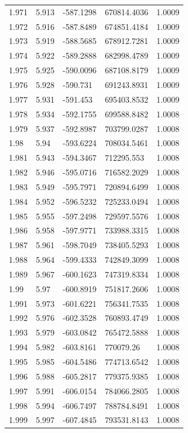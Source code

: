 \begin{tabular}{lllll}
1.971 & 5.913 & -587.1298 & 670814.4036 & 1.0009 \\
1.972 & 5.916 & -587.8489 & 674851.4184 & 1.0009 \\
1.973 & 5.919 & -588.5685 & 678912.7281 & 1.0009 \\
1.974 & 5.922 & -589.2888 & 682998.4789 & 1.0009 \\
1.975 & 5.925 & -590.0096 & 687108.8179 & 1.0009 \\
1.976 & 5.928 & -590.731 & 691243.8931 & 1.0009 \\
1.977 & 5.931 & -591.453 & 695403.8532 & 1.0009 \\
1.978 & 5.934 & -592.1755 & 699588.8482 & 1.0008 \\
1.979 & 5.937 & -592.8987 & 703799.0287 & 1.0008 \\
1.98 & 5.94 & -593.6224 & 708034.5461 & 1.0008 \\
1.981 & 5.943 & -594.3467 & 712295.553 & 1.0008 \\
1.982 & 5.946 & -595.0716 & 716582.2029 & 1.0008 \\
1.983 & 5.949 & -595.7971 & 720894.6499 & 1.0008 \\
1.984 & 5.952 & -596.5232 & 725233.0494 & 1.0008 \\
1.985 & 5.955 & -597.2498 & 729597.5576 & 1.0008 \\
1.986 & 5.958 & -597.9771 & 733988.3315 & 1.0008 \\
1.987 & 5.961 & -598.7049 & 738405.5293 & 1.0008 \\
1.988 & 5.964 & -599.4333 & 742849.3099 & 1.0008 \\
1.989 & 5.967 & -600.1623 & 747319.8334 & 1.0008 \\
1.99 & 5.97 & -600.8919 & 751817.2606 & 1.0008 \\
1.991 & 5.973 & -601.6221 & 756341.7535 & 1.0008 \\
1.992 & 5.976 & -602.3528 & 760893.4749 & 1.0008 \\
1.993 & 5.979 & -603.0842 & 765472.5888 & 1.0008 \\
1.994 & 5.982 & -603.8161 & 770079.26 & 1.0008 \\
1.995 & 5.985 & -604.5486 & 774713.6542 & 1.0008 \\
1.996 & 5.988 & -605.2817 & 779375.9385 & 1.0008 \\
1.997 & 5.991 & -606.0154 & 784066.2805 & 1.0008 \\
1.998 & 5.994 & -606.7497 & 788784.8491 & 1.0008 \\
1.999 & 5.997 & -607.4845 & 793531.8143 & 1.0008 \\

\end{tabular}
